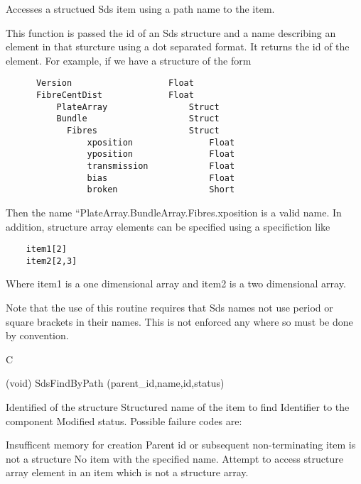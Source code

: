 \begin{manroutinedescription}
        Accesses a structued Sds item using a path name to the item.
 
        This function is passed the id of an Sds structure and a
        name describing an element in that sturcture using a dot separated
        format.  It returns the id of the element.  For example, if we
        have a structure of the form

\begin{verbatim}
	  Version              		Float
	  FibreCentDist        		Float
    	  PlateArray           		Struct
          Bundle             		Struct
            Fibres           		Struct
                xposition            	Float
                yposition            	Float
                transmission         	Float
                bias                 	Float
                broken               	Short

\end{verbatim}
	Then the name ``PlateArray.BundleArray.Fibres.xposition
	is a valid name.  In addition, structure array elements can
	be specified using  a specifiction like
	
\begin{verbatim}
	item1[2]
	item2[2,3]
\end{verbatim}	
        Where item1 is a one dimensional array and item2 is a two 
        dimensional array.

	Note that the use of this routine requires that Sds names not use
	period or square brackets in their names.  This is not enforced any
	where so must be done by convention.
 
      C
 
     (void) {\mantt{=}} SdsFindByPath (parent\_{}id,name,id,status)
 
\begin{manparametertable}
 Identified of the %
structure
 Structured name of the %
item to find
 Identifier to the %
component
	Modified status.  Possible %
failure
  				codes are:
 
\end{manparametertable}
\begin{mantwocolumntable}
Insufficent memory for creation
Parent id or subsequent
  				non-terminating item is not a structure
No item with the specified name.
Attempt to access structure %
array
  				element in an item which is not a structure
  				array.
 

\end{mantwocolumntable}
\end{manroutinedescription}
